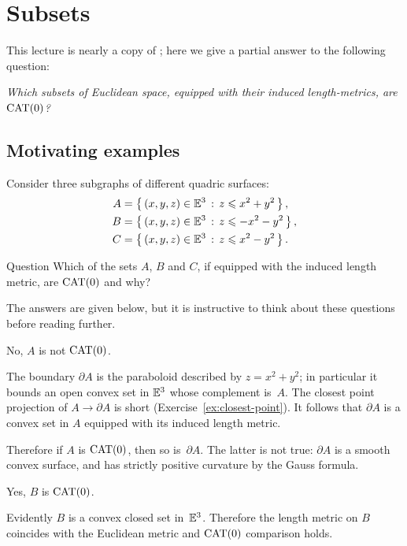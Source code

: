 \chapter{Subsets}\label{chapter:shefel}

This lecture is nearly a copy of \cite[Chapter 4]{alexander-kapovitch-petrunin-2019};
here we give a partial answer to the following question:

\smallskip

{}\emph{Which subsets of Euclidean space, equipped with their induced length-metrics, are  $\mathrm{CAT}(0)$?}




\section{Motivating examples}\label{sec:solid-parabolonds}

Consider three subgraphs of different quadric surfaces:
\begin{align*}
A&=\left\{\,{(x,y,z)\in\mathbb{E}^3}\,:\,{z\leqslant x^2+y^2}\,\right\},
\\
B&=\left\{\,{(x,y,z)\in\mathbb{E}^3}\,:\,{z\leqslant -x^2-y^2}\,\right\},
\\
C&=\left\{\,{(x,y,z)\in\mathbb{E}^3}\,:\,{z\leqslant x^2-y^2}\,\right\}.
\end{align*}

\begin{thm}{Question}\label{CAT(0)?}
Which of the sets $A$, $B$ and $C$, if equipped with the induced length metric, are $\mathrm{CAT}(0)$ and why?
\end{thm}

The answers are given below, but it is instructive to think about these questions before reading further.

 No, $A$ is not $\mathrm{CAT}(0)$.
 
The boundary $\partial A$ is the paraboloid described by  $z=x^2+y^2$;  in particular it bounds an open convex set in $\mathbb{E}^3$ whose complement is~$A$.
The closest point projection of $A\to\partial A$ is short (Exercise~\ref{ex:closest-point}).
It follows that $\partial A$ is a convex set in $A$ equipped with its induced length metric.

Therefore if $A$ is $\mathrm{CAT}(0)$, then so is~$\partial A$.
The latter is not true: $\partial A$ is a smooth convex surface, and has strictly positive curvature by the Gauss formula.


 Yes, $B$ is $\mathrm{CAT}(0)$. 

Evidently $B$ is a convex closed set in~$\mathbb{E}^3$. 
Therefore the length metric on $B$ coincides with the Euclidean metric
and $\mathrm{CAT}(0)$ comparison holds.

